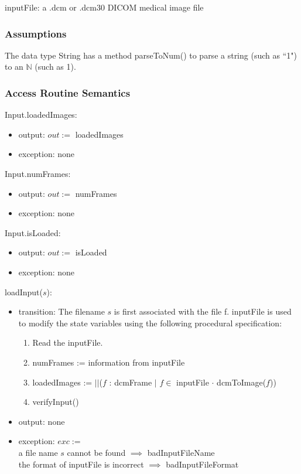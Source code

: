 \documentclass[12pt, titlepage]{article}
\begin{document}
inputFile: a .dcm or .dcm30 DICOM medical image file

\subsubsection{Assumptions}

The data type String has a method parseToNum() to parse a string (such as ``1")
to an $\mathbb{N}$ (such as 1).

\subsubsection{Access Routine Semantics}

\noindent Input.loadedImages:
\begin{itemize}
\item output: $out:=$ loadedImages 
\item exception: none 
\end{itemize}

\noindent Input.numFrames:
\begin{itemize}
\item output: $out:=$ numFrames 
\item exception: none 
\end{itemize}

\noindent Input.isLoaded:
\begin{itemize}
\item output: $out:=$ isLoaded 
\item exception: none 
\end{itemize}

\noindent loadInput($s$):
\begin{itemize}
\item transition: 
The filename $s$ is first associated with the file f. inputFile is used to
modify
the state variables using the following procedural specification:
\begin{enumerate}
    \item Read the inputFile.
    \item
    numFrames := information from inputFile
    \item
loadedImages := $||$($f$ : dcmFrame $|$ $f \in $ inputFile $\cdot$
dcmToImage($f$))
    \item
    verifyInput()
\end{enumerate}
\item output: none
\item exception: $exc :=$\\
a file name $s$ cannot be found
$\implies$ badInputFileName\\
the format of
inputFile is incorrect $\implies$ badInputFileFormat\\
\end{itemize}
\end{document}
